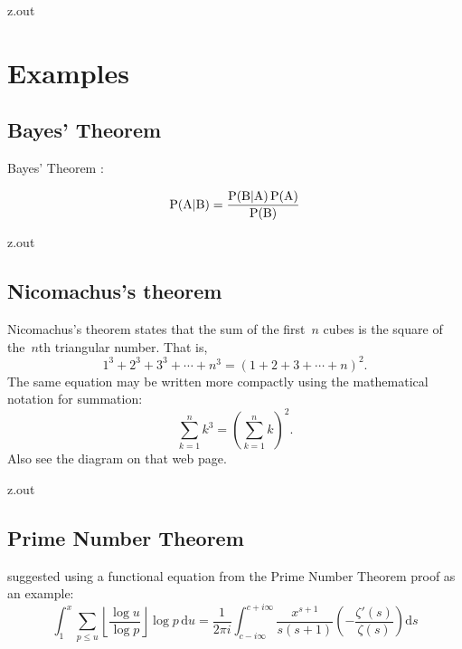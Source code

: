 \begin{VerbatimOut}{z.out}


\section{Examples}

\subsection{Bayes' Theorem}

Bayes' Theorem
\cite{bayes}:

{
  \UndefineShortVerb{\|}
\[
  \text{P}(\text A|\text B)
    = \frac{\text P(\text B|\text A)\,\text P(\text A)}{\text P(\text B)}
\]
}
\end{VerbatimOut}

\MyIO


\begin{VerbatimOut}{z.out}

\subsection{Nicomachus's theorem}

Nicomachus's theorem
\cite{wikipedia-nicomachus}
states that
the sum of the first~$n$ cubes is the square of the~$n$th triangular number.
That is,
\[
  1^3 + 2^3 + 3^3 + \cdots + n^3 = (1 + 2 + 3 + \cdots + n)^2.
\]
The same equation may be written more compactly using the mathematical notation for summation:
\[
  \sum_{k=1}^n k^3 = \left(\sum_{k=1}^n k\right)^2.
\]
Also see the diagram on that web page.
\end{VerbatimOut}

\MyIO


\begin{VerbatimOut}{z.out}

\subsection{Prime Number Theorem}

\textcite{li2013}
suggested using a functional equation
from the Prime Number Theorem proof
as an example:
\begin{equation}
  \int_1^x
    \sum_{p\le u}
    \left\lfloor\frac{\log u}{\log p}\right\rfloor
    \log p
    \,\text{d}u
    =
    \frac1{2\pi i}
    \int_{c-i\infty}^{c+i\infty}
    \frac{x^{s+1}}{s(s+1)}
    \left(-\frac{\zeta'(s)}{\zeta(s)}\right)
    \text{d}s
\end{equation}
\end{VerbatimOut}

